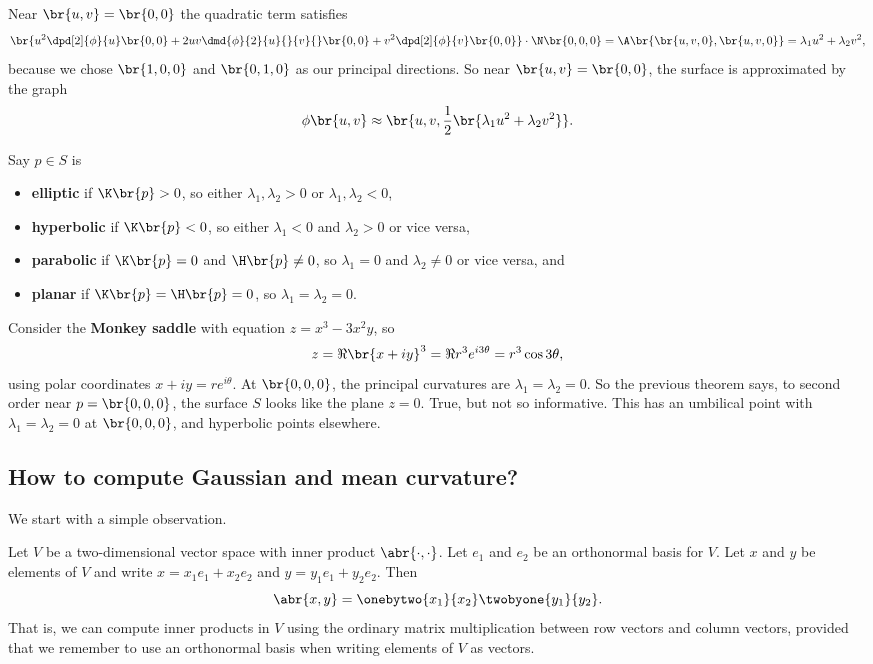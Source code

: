 \pagebreak

Near $ \br{u, v} = \br{0, 0} $ the quadratic term satisfies
$$ \br{u^2\dpd[2]{\phi}{u}\br{0, 0} + 2uv\dmd{\phi}{2}{u}{}{v}{}\br{0, 0} + v^2\dpd[2]{\phi}{v}\br{0, 0}} \cdot \N\br{0, 0, 0} = \A\br{\br{u, v, 0}, \br{u, v, 0}} = \lambda_1u^2 + \lambda_2v^2, $$
because we chose $ \br{1, 0, 0} $ and $ \br{0, 1, 0} $ as our principal directions. So near $ \br{u, v} = \br{0, 0} $, the surface is approximated by the graph
$$ \phi\br{u, v} \approx \br{u, v, \dfrac{1}{2}\br{\lambda_1u^2 + \lambda_2v^2}}. $$


Say $ p \in S $ is
\begin{itemize}
\item \textbf{elliptic} if $ \K\br{p} > 0 $, so either $ \lambda_1, \lambda_2 > 0 $ or $ \lambda_1, \lambda_2 < 0 $,
\item \textbf{hyperbolic} if $ \K\br{p} < 0 $, so either $ \lambda_1 < 0 $ and $ \lambda_2 > 0 $ or vice versa,
\item \textbf{parabolic} if $ \K\br{p} = 0 $ and $ \H\br{p} \ne 0 $, so $ \lambda_1 = 0 $ and $ \lambda_2 \ne 0 $ or vice versa, and
\item \textbf{planar} if $ \K\br{p} = \H\br{p} = 0 $, so $ \lambda_1 = \lambda_2 = 0 $.
\end{itemize}

\begin{example*}
Consider the \textbf{Monkey saddle} with equation $ z = x^3 - 3x^2y $, so
$$ z = \Re \br{x + iy}^3 = \Re r^3e^{i3\theta} = r^3\cos 3\theta, $$
using polar coordinates $ x + iy = re^{i\theta} $. At $ \br{0, 0, 0} $, the principal curvatures are $ \lambda_1 = \lambda_2 = 0 $. So the previous theorem says, to second order near $ p = \br{0, 0, 0} $, the surface $ S $ looks like the plane $ z = 0 $. True, but not so informative. This has an umbilical point with $ \lambda_1 = \lambda_2 = 0 $ at $ \br{0, 0, 0} $, and hyperbolic points elsewhere.
\end{example*}

\subsection{How to compute Gaussian and mean curvature?}

We start with a simple observation.

\begin{lemma}
\label{lem:innerproduct}
Let $ V $ be a two-dimensional vector space with inner product $ \abr{\cdot, \cdot} $. Let $ e_1 $ and $ e_2 $ be an orthonormal basis for $ V $. Let $ x $ and $ y $ be elements of $ V $ and write $ x = x_1e_1 + x_2e_2 $ and $ y = y_1e_1 + y_2e_2 $. Then
$$ \abr{x, y} = \onebytwo{x_1}{x_2}\twobyone{y_1}{y_2}. $$
That is, we can compute inner products in $ V $ using the ordinary matrix multiplication between row vectors and column vectors, provided that we remember to use an orthonormal basis when writing elements of $ V $ as vectors.
\end{lemma}

